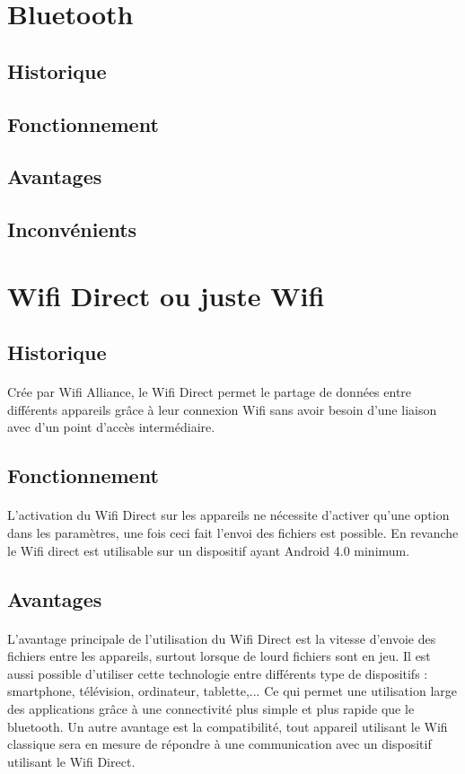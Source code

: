 \documentclass[a4paper,10pt]{report}
\begin{document}
  \section{Bluetooth}
    \subsection{Historique}
    \subsection{Fonctionnement} 
    \subsection{Avantages}
    \subsection{Inconvénients}
  \section{Wifi Direct ou juste Wifi} 
    \subsection{Historique}
      \paragraph{}
      Crée par Wifi Alliance, le Wifi Direct permet le partage de données entre différents appareils grâce à leur connexion Wifi sans avoir besoin d'une liaison avec d'un point d'accès intermédiaire.
    \subsection{Fonctionnement}
     \paragraph{}
    L'activation du Wifi Direct sur les appareils ne nécessite d'activer qu'une option dans les paramètres, une fois ceci fait l'envoi des fichiers est possible. En revanche le Wifi direct est utilisable sur un dispositif ayant Android 4.0 minimum. 
    \subsection{Avantages}
     \paragraph{}
     L'avantage principale de l'utilisation du Wifi Direct est la vitesse d'envoie des fichiers entre les appareils, surtout lorsque de lourd fichiers sont en jeu. 
     Il est aussi possible d'utiliser cette technologie entre différents type de dispositifs : smartphone, télévision, ordinateur, tablette,... Ce qui permet une utilisation large des applications grâce à une connectivité plus simple et plus rapide que le bluetooth. Un autre avantage est la compatibilité, tout appareil utilisant le Wifi classique sera en mesure de répondre à une communication avec un dispositif utilisant le Wifi Direct.
\end{document}
